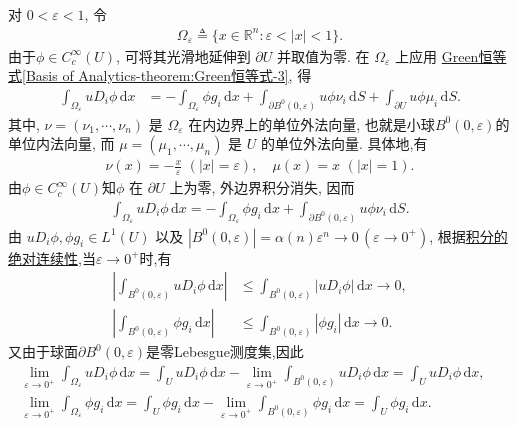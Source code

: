 \documentclass[../../main.tex]{subfiles}
\begin{document}
\begin{solution}
对 $0<\varepsilon<1$, 令
\begin{align*}
\Omega_\varepsilon
\triangleq\{x\in\mathbb{R}^n:\varepsilon<|x|<1\}.
\end{align*}
由于$\phi\in C_c^\infty(U)$, 可将其光滑地延伸到 $\partial U$ 并取值为零. 在 $\Omega_\varepsilon$ 上应用
\hyperref[Basis of Analytics-theorem:Green恒等式-3]{Green恒等式\ref{Basis of Analytics-theorem:Green恒等式-3}}, 得
\begin{align*}
\int_{\Omega_\varepsilon}uD_i\phi\,\mathrm{d}x
&=-\int_{\Omega_\varepsilon}\phi g_i\,\mathrm{d}x
+\int_{\partial B^{0}(0,\varepsilon)}u\phi\nu_i\,\mathrm{d}S
+\int_{\partial U}u\phi\mu_i\,\mathrm{d}S.
\end{align*}
其中, $\nu=(\nu_1,\cdots,\nu_n)$ 是 $\Omega_\varepsilon$ 在内边界上的单位外法向量, 也就是小球$B^{0}(0,\varepsilon)$的单位内法向量, 而 $\mu=(\mu_1,\cdots,\mu_n)$ 是 $U$ 的单位外法向量. 具体地,有
\begin{align*}
\nu (x)=-\frac{x}{\varepsilon}\,\,\left( |x|=\varepsilon \right) ,\quad \mu (x)=x\,\,\left( |x|=1 \right) .
\end{align*}
由$\phi\in C_c^\infty(U)$知$\phi$ 在 $\partial U$ 上为零, 外边界积分消失, 因而
\begin{align}\label{eq::JIOJIOWJ22221}
\int_{\Omega_\varepsilon}uD_i\phi\,\mathrm{d}x
=-\int_{\Omega_\varepsilon}\phi g_i\,\mathrm{d}x
+\int_{\partial B^{0}(0,\varepsilon)}u\phi\nu_i\,\mathrm{d}S.
\end{align}
由 $uD_i\phi,\phi g_i\in L^1(U)$ 以及
$|B^{0}(0,\varepsilon)|=\alpha(n)\varepsilon^n\to0\,(\varepsilon \to 0^+)$, 根据\hyperref[Real Analysis-theorem:积分的绝对连续性]{积分的绝对连续性},当$\varepsilon \to 0^+$时,有
\begin{align*}
\left|
\int_{B^{0}(0,\varepsilon)}uD_i\phi\,\mathrm{d}x
\right|
&\leqslant
\int_{B^{0}(0,\varepsilon)}|uD_i\phi|\,\mathrm{d}x
\longrightarrow0,\\
\left|
\int_{B^{0}(0,\varepsilon)}\phi g_i\,\mathrm{d}x
\right|
&\leqslant
\int_{B^{0}(0,\varepsilon)}|\phi g_i|\,\mathrm{d}x
\longrightarrow0.
\end{align*}
又由于球面$\partial B^{0}(0,\varepsilon)$是零Lebesgue测度集,因此
\begin{gather*}
\lim_{\varepsilon \rightarrow 0^+} \int_{\Omega _{\varepsilon}}{uD_i\phi \,\mathrm{d}x}=\int_U{uD_i\phi \,\mathrm{d}x}-\lim_{\varepsilon \rightarrow 0^+} \int_{B^0(0,\varepsilon )}{uD_i\phi \,\mathrm{d}x}=\int_U{uD_i\phi \,\mathrm{d}x},\quad 
\\
\lim_{\varepsilon \rightarrow 0^+} \int_{\Omega _{\varepsilon}}{\phi g_i\,\mathrm{d}x}=\int_U{\phi g_i\,\mathrm{d}x}-\lim_{\varepsilon \rightarrow 0^+} \int_{B^0(0,\varepsilon )}{\phi g_i\,\mathrm{d}x}=\int_U{\phi g_i\,\mathrm{d}x}.

\end{gather*}
\end{solution}
\end{document}
